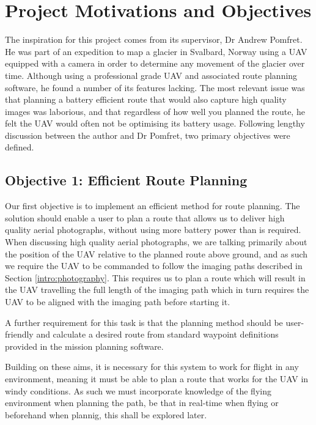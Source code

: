 \section{Project Motivations and Objectives} 
\label{intro:objectives}

The inspiration for this project comes from its supervisor, Dr Andrew Pomfret. He was part of an expedition to map a glacier in Svalbard, Norway using a UAV equipped with a camera in order to determine any movement of the glacier over time. Although using a professional grade UAV and associated route planning software, he found a number of its features lacking. The most relevant issue was that planning a battery efficient route that would also capture high quality images was laborious, and that regardless of how well you planned the route, he felt the UAV would often not be optimising its battery usage. Following lengthy discussion between the author and Dr Pomfret, two primary objectives were defined.

\subsection{Objective 1: Efficient Route Planning}
\label{intro:obj1}
Our first objective is to implement an efficient method for route planning. The solution should enable a user to plan a route that allows us to deliver high quality aerial photographs, without using more battery power than is required. When discussing high quality aerial photographs, we are talking primarily about the position of the UAV relative to the planned route above ground, and as such we require the UAV to be commanded to follow the imaging paths described in Section \ref{intro:photography}. This requires us to plan a route which will result in the UAV travelling the full length of the imaging path which in turn requires the UAV to be aligned with the imaging path before starting it. 

A further requirement for this task is that the planning method should be user-friendly and calculate a desired route from standard waypoint definitions provided in the mission planning software.

Building on these aims, it is necessary for this system to work for flight in any environment, meaning it must be able to plan a route that works for the UAV in windy conditions. As such we must incorporate knowledge of the flying environment when planning the path, be that in real-time when flying or beforehand when plannig, this shall be explored later.

